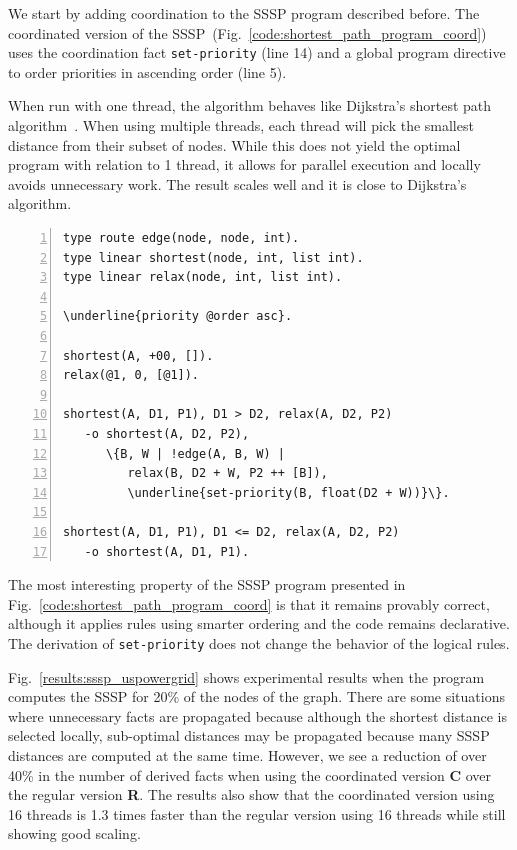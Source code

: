 We start by adding coordination to the SSSP program described before.
The coordinated version of the
SSSP~(Fig.~\ref{code:shortest_path_program_coord}) uses the coordination fact
\texttt{set-priority} (line 14) and a global program directive to order
priorities in ascending order (line 5).

When run with one thread, the algorithm behaves like
Dijkstra's shortest path algorithm~\cite{Dijkstra}. When using multiple
threads, each thread will pick the smallest distance from their subset of nodes.
While this does not yield the optimal program with relation to 1 thread, it
allows for parallel execution and locally avoids unnecessary work. The result
scales well and it is close to Dijkstra's algorithm.

\begin{topfig}
\scriptsize\begin{Verbatim}[numbers=left,commandchars=\\\{\}]
type route edge(node, node, int).
type linear shortest(node, int, list int).
type linear relax(node, int, list int).

\underline{priority @order asc}.

shortest(A, +00, []).
relax(@1, 0, [@1]).

shortest(A, D1, P1), D1 > D2, relax(A, D2, P2)
   -o shortest(A, D2, P2),
      \{B, W | !edge(A, B, W) |
         relax(B, D2 + W, P2 ++ [B]),
         \underline{set-priority(B, float(D2 + W))}\}.

shortest(A, D1, P1), D1 <= D2, relax(A, D2, P2)
   -o shortest(A, D1, P1).
\end{Verbatim}
\end{topfig}
\normalsize

The most interesting property of the SSSP program presented in
Fig.~\ref{code:shortest_path_program_coord} is that it remains provably correct,
although it applies rules using smarter ordering and the code remains
declarative. The derivation of \texttt{set-priority} does not change the
behavior of the logical rules.

Fig.~\ref{results:sssp_uspowergrid} shows experimental results when the
program computes the SSSP for 20\% of the nodes of the graph.
There are some situations where unnecessary facts are propagated
because although the shortest distance is selected locally, sub-optimal distances may be
propagated because many SSSP distances are computed at the same time.
However, we see a reduction of over 40\% in the number of
derived facts when using the coordinated version \textbf{C} over the regular
version \textbf{R}. The results also show that the coordinated
version using 16 threads is 1.3 times faster than the regular version using 16
threads while still showing good scaling.

